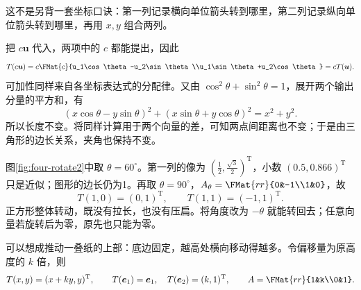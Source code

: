\documentclass[a4paper,12pt,twoside,openany,fontset=none]{ctexbook}
\numberwithin{equation}{chapter}
\begin{document}
这不是另背一套坐标口诀：第一列记录横向单位箭头转到哪里，第二列记录纵向单位箭头转到哪里，再用 $x,y$ 组合两列。

把 $c\boldsymbol u$ 代入，两项中的 $c$ 都能提出，因此
\[
 T(c\boldsymbol u)=
 c\FMat{c}{u_1\cos\theta-u_2\sin\theta\\u_1\sin\theta+u_2\cos\theta}
 =cT(\boldsymbol u).
\]
可加性同样来自各坐标表达式的分配律。又由 $\cos^2\theta+\sin^2\theta=1$，展开两个输出分量的平方和，有
\[
 (x\cos\theta-y\sin\theta)^2+(x\sin\theta+y\cos\theta)^2=x^2+y^2.
\]
所以长度不变。将同样计算用于两个向量的差，可知两点间距离也不变；于是由三角形的边长关系，夹角也保持不变。

图\ref{fig:four-rotate2}中取 $\theta=60^\circ$。第一列的像为 $(\tfrac12,\tfrac{\sqrt3}{2})^{\mathrm T}$，小数 $(0.5,0.866)^{\mathrm T}$ 只是近似；图形的边长仍为1。再取 $\theta=90^\circ$，$A_\theta=\FMat{rr}{0&-1\\1&0}$，故
\[
 T(1,0)=(0,1)^{\mathrm T},\qquad T(1,1)=(-1,1)^{\mathrm T}.
\]
正方形整体转动，既没有拉长，也没有压扁。将角度改为 $-\theta$ 就能转回去；任意向量若旋转后为零，原先也只能为零。

可以想成推动一叠纸的上部：底边固定，越高处横向移动得越多。令偏移量为原高度的 $k$ 倍，则
\[
 T(x,y)=(x+ky,y)^{\mathrm T},\qquad
 T(\boldsymbol e_1)=\boldsymbol e_1,\quad T(\boldsymbol e_2)=(k,1)^{\mathrm T},
 \qquad A=\FMat{rr}{1&k\\0&1}.
\]
\end{document}
